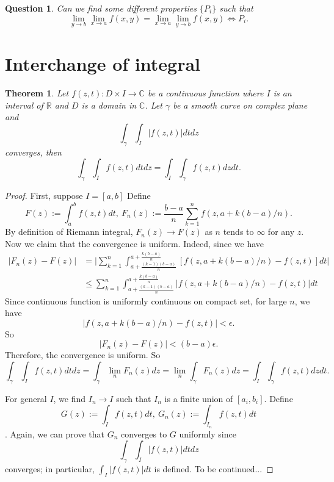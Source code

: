 \documentclass{book}
\newtheorem{thm}[defi]{Theorem}
\newtheorem{q}[defi]{Question}
\numberwithin{equation}{section}
\begin{document}
\begin{q}
Can we find some different properties $\{P_i\}$ such that
$$
\lim\limits_{y\rightarrow b}\lim\limits_{x\rightarrow a}f(x,y)=\lim\limits_{x\rightarrow a}\lim\limits_{y\rightarrow b}f(x,y) \Leftrightarrow P_i.
$$
\end{q}

\section{Interchange of integral}
\begin{thm}
Let $f(z,t):D \times I \rightarrow \mathbb{C}$ be a continuous function where $I$ is an interval of $\mathbb{R}$ and $D$ is a domain in $\mathbb{C}$. Let $\gamma$ be a smooth curve on complex plane and 
$$
\int_{\gamma}\int_I |f(z,t)|dt dz
$$ converges, then
$$
\int_{\gamma}\int_I f(z,t)dt dz=\int_I \int_{\gamma} f(z,t) dz dt.
$$
\end{thm}
\begin{proof}
First, suppose $I=[a,b]$ Define
$$
F(z):=\int_{a}^b f(z,t)dt, \ F_n(z):=\frac{b-a}{n}\sum_{k=1}^n f(z,a+k(b-a)/n).
$$
By definition of Riemann integral, $F_n(z)\rightarrow F(z)$ as $n$ tends to $\infty$ for any $z.$ Now we claim that the convergence is uniform. Indeed, since we have
$$
\begin{aligned}
|F_n(z)-F(z)|&=\bigg|\sum_{k=1}^n \int_{a+\frac{(k-1)(b-a)}{n}}^{a+\frac{k(b-a)}{n}}[f(z,a+k(b-a)/n)-f(z,t)]dt\bigg| \\
&\leq \sum_{k=1}^n \int_{a+\frac{(k-1)(b-a)}{n}}^{a+\frac{k(b-a)}{n}}\bigg|f(z,a+k(b-a)/n)-f(z,t)\bigg|dt
\end{aligned}
$$ Since continuous function is uniformly continuous on compact set, for large $n$, we have 
$$
\bigg|f(z,a+k(b-a)/n)-f(z,t)\bigg|< \epsilon.
$$
So
$$
|F_n(z)-F(z)|< (b-a)\epsilon.
$$ Therefore, the convergence is uniform. So 
$$
\int_{\gamma}\int_I f(z,t)dt dz=\int_{\gamma} \lim_n F_n(z) dz= \lim_n \int_{\gamma} F_n(z) dz =\int_I \int_{\gamma} f(z,t) dz dt.
$$\medskip

For general $I$, we find $I_n\rightarrow I$ such that $I_n$ is a finite union of $[a_i,b_i].$ Define
$$
G(z):=\int_I f(z,t)dt, \ G_n(z):=\int_{I_n} f(z,t)dt
$$. Again, we can prove that $G_n$ converges to $G$ uniformly since
$$
\int_{\gamma}\int_I |f(z,t)|dt dz
$$ converges; in particular, $\int_I |f(z,t)|dt$ is defined. To be continued...
\end{proof}
\end{document}
